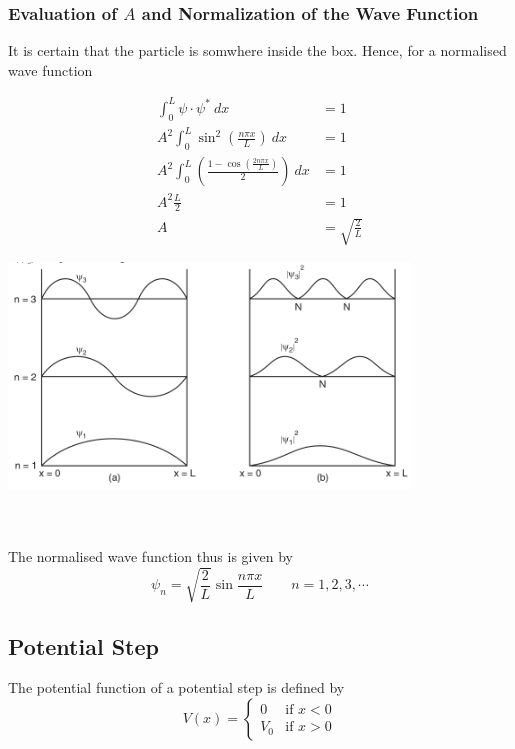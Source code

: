 \documentclass[12pt]{article}
\numberwithin{equation}{subsection}
\begin{document}
\subsubsection{Evaluation of $A$ and Normalization of the Wave Function}
It is certain that the particle is somwhere inside the box. Hence, for a normalised wave function
\begin{minipage}{0.45\textwidth}
    \begin{align*}
        \int_{0}^{L} {\psi\cdot\psi^{*}} \: d{x} &= 1 \\
        A^2 \int_{0}^{L} {\sin^2{\left( \frac{n\pi x}{L} \right)}} \: d{x} &= 1 \\
        A^2 \int_{0}^{L} {\left( \frac{1 - \cos{\left( \frac{2n\pi x}{L} \right)}}{2} \right)} \: d{x} &= 1 \\
        A^2 \frac{L}{2} &= 1 \\
        A &= \sqrt{\frac{2}{L}}
    \end{align*}

\end{minipage}
\begin{minipage}{0.6\textwidth}
    \includegraphics[width=0.8\textwidth]{potential well2.png}
\end{minipage}\\~\\

The normalised wave function thus is given by
\begin{equation}
    \boxed{ \psi_n = \sqrt{\frac{2}{L}} \sin{\frac{n\pi x}{L}} } \qquad n=1,2,3,\cdots
\end{equation}

\subsection{Potential Step}
The potential function of a potential step is defined by
\begin{equation}
    V(x) = \begin{cases}
        0 & \text{if } x < 0 \\
        V_0 & \text{if } x > 0
    \end{cases}
\end{equation}
\end{document}

